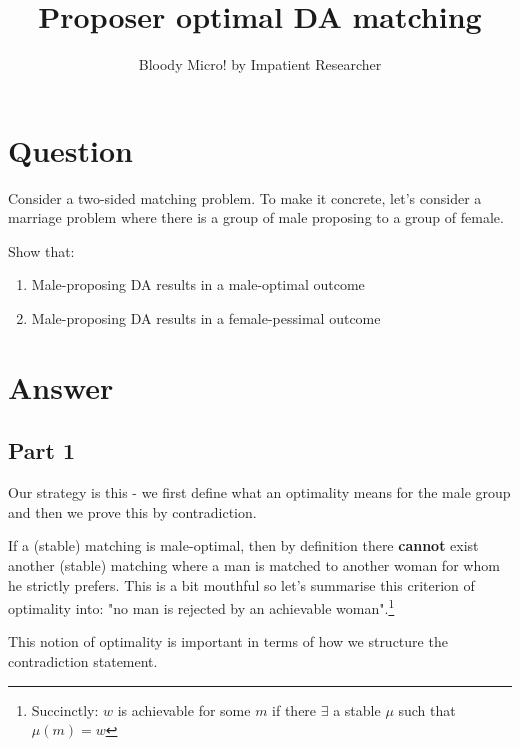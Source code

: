 \documentclass{tufte-handout}
\title{Proposer optimal DA matching}
\author{Bloody Micro! by Impatient Researcher}
\begin{document}
\maketitle%


\section{Question}\label{sec:question}

Consider a two-sided matching problem. To make it concrete, let's consider a marriage problem where there is a group of male proposing to a group of female.

\bigskip

\noindent Show that:
\begin{enumerate}
    \item Male-proposing DA results in a male-optimal outcome
    \item Male-proposing DA results in a female-pessimal outcome
\end{enumerate}

\section{Answer}\label{sec:answer}

\subsection{Part 1}\label{sec:answer-part-one}

Our strategy is this - we first define what an optimality means for the male group and then we prove this by contradiction.

\bigskip

\noindent If a (stable) matching is male-optimal, then by definition there \textbf{cannot} exist another (stable) matching where a man is matched to another woman for whom he strictly prefers. This is a bit mouthful so let's summarise this criterion of optimality into: "no man is rejected by an achievable woman".\footnote{Succinctly: $w$ is achievable for some $m$ if there $\exists$ a stable $\mu$ such that $\mu(m) = w$}

\bigskip 

\noindent This notion of optimality is important in terms of how we structure the contradiction statement.
\end{document}
